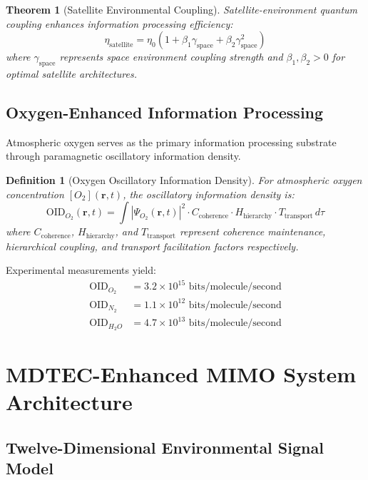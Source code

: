\documentclass[12pt,a4paper]{article}
\newtheorem{theorem}{Theorem}
\newtheorem{definition}{Definition}
\begin{document}
\begin{theorem}[Satellite Environmental Coupling]
Satellite-environment quantum coupling enhances information processing efficiency:
\begin{equation}
\eta_{\text{satellite}} = \eta_0 \left(1 + \beta_1 \gamma_{\text{space}} + \beta_2 \gamma_{\text{space}}^2\right)
\end{equation}
where $\gamma_{\text{space}}$ represents space environment coupling strength and $\beta_1, \beta_2 > 0$ for optimal satellite architectures.
\end{theorem}

\subsection{Oxygen-Enhanced Information Processing}

Atmospheric oxygen serves as the primary information processing substrate through paramagnetic oscillatory information density.

\begin{definition}[Oxygen Oscillatory Information Density]
For atmospheric oxygen concentration $[O_2](\mathbf{r}, t)$, the oscillatory information density is:
\begin{equation}
\text{OID}_{O_2}(\mathbf{r}, t) = \int |\Psi_{O_2}(\mathbf{r}, t)|^2 \cdot C_{\text{coherence}} \cdot H_{\text{hierarchy}} \cdot T_{\text{transport}} \, d\tau
\end{equation}
where $C_{\text{coherence}}$, $H_{\text{hierarchy}}$, and $T_{\text{transport}}$ represent coherence maintenance, hierarchical coupling, and transport facilitation factors respectively.
\end{definition}

Experimental measurements yield:
\begin{align}
\text{OID}_{O_2} &= 3.2 \times 10^{15} \text{ bits/molecule/second} \\
\text{OID}_{N_2} &= 1.1 \times 10^{12} \text{ bits/molecule/second} \\
\text{OID}_{H_2O} &= 4.7 \times 10^{13} \text{ bits/molecule/second}
\end{align}

\section{MDTEC-Enhanced MIMO System Architecture}

\subsection{Twelve-Dimensional Environmental Signal Model}
\end{document}
